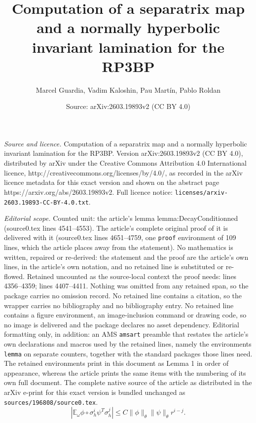 \documentclass[10pt,a4paper]{amsart}
\title{Computation of a separatrix map and a normally hyperbolic invariant lamination for the RP3BP}
\author{Marcel Guardia, Vadim Kaloshin, Pau Mart\'in, Pablo Roldan}
\date{Source: arXiv:2603.19893v2 (CC BY 4.0)}
\newcommand{\E}{\mathbb{E}}
\begin{document}
\maketitle

\noindent\emph{Source and licence.} Computation of a separatrix map and a normally hyperbolic invariant lamination for the RP3BP. Version arXiv:2603.19893v2 (CC BY 4.0), distributed by arXiv under the Creative Commons Attribution 4.0 International licence, http://creativecommons.org/licenses/by/4.0/, as recorded in the arXiv licence metadata for this exact version and shown on the abstract page https://arxiv.org/abs/2603.19893v2. Full licence notice: \texttt{licenses/arxiv-2603.19893-CC-BY-4.0.txt}.\par\smallskip

\noindent\textit{Editorial scope.} Counted unit: the article's lemma lemma:DecayConditionned (source0.tex lines 4541--4553). The article's complete original proof of it is delivered with it (source0.tex lines 4651--4759, one \texttt{proof} environment of 109 lines, which the article places away from the statement). No mathematics is written, repaired or re-derived: the statement and the proof are the article's own lines, in the article's own notation, and no retained line is substituted or re-flowed.  Retained uncounted as the source-local context the proof needs: lines 4356--4359; lines 4407--4411.  Nothing was omitted from any retained span, so the package carries no omission record.  No retained line contains a citation, so the wrapper carries no bibliography and no bibliography entry.  No retained line contains a figure environment, an image-inclusion command or drawing code, so no image is delivered and the package declares no asset dependency.  Editorial formatting only, in addition: an AMS \texttt{amsart} preamble that restates the article's own declarations and macros used by the retained lines, namely the environments \texttt{lemma} on separate counters, together with the standard packages those lines need.  The retained environments print in this document as Lemma 1 in order of appearance, whereas the article prints the same items with the numbering of its own full document.  The complete native source of the article as distributed in the arXiv e-print for this exact version is bundled unchanged as \texttt{sources/196808/source0.tex}.
\begin{equation}\label{def:DecayCorrExpectheta}
 \left|\E_\omega \phi\circ\sigma_h^i\psi^T\sigma_h^j\right|\leq 
C\|\phi\|_\theta \|\psi\|_\theta r^{i-j}.
\end{equation}
\end{document}

